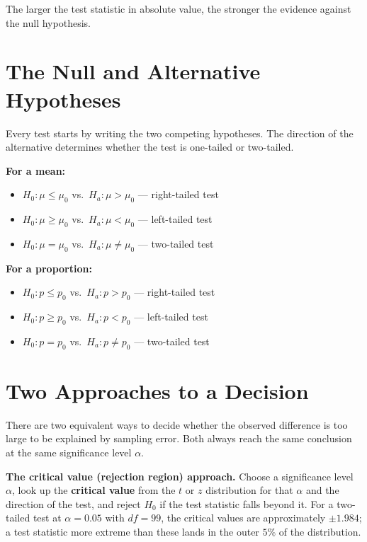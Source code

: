 \documentclass[
  11pt,
  letterpaper,
  DIV=11,
  numbers=noendperiod,
  oneside,
  open=any]{scrreprt}
\providecommand{\tightlist}{%
  \setlength{\itemsep}{0pt}\setlength{\parskip}{0pt}}\usepackage{longtable,booktabs,array}
\begin{document}
The larger the test statistic in absolute value, the stronger the
evidence against the null hypothesis.

\section{The Null and Alternative
Hypotheses}\label{the-null-and-alternative-hypotheses}

Every test starts by writing the two competing hypotheses. The direction
of the alternative determines whether the test is one-tailed or
two-tailed.

\textbf{For a mean:}

\begin{itemize}
\tightlist
\item
  \(H_0: \mu \leq \mu_0\) vs.~\(H_a: \mu > \mu_0\) --- right-tailed test
\item
  \(H_0: \mu \geq \mu_0\) vs.~\(H_a: \mu < \mu_0\) --- left-tailed test
\item
  \(H_0: \mu = \mu_0\) vs.~\(H_a: \mu \ne \mu_0\) --- two-tailed test
\end{itemize}

\textbf{For a proportion:}

\begin{itemize}
\tightlist
\item
  \(H_0: p \leq p_0\) vs.~\(H_a: p > p_0\) --- right-tailed test
\item
  \(H_0: p \geq p_0\) vs.~\(H_a: p < p_0\) --- left-tailed test
\item
  \(H_0: p = p_0\) vs.~\(H_a: p \ne p_0\) --- two-tailed test
\end{itemize}

\section{Two Approaches to a
Decision}\label{two-approaches-to-a-decision}

There are two equivalent ways to decide whether the observed difference
is too large to be explained by sampling error. Both always reach the
same conclusion at the same significance level \(\alpha\).

\textbf{The critical value (rejection region) approach.} Choose a
significance level \(\alpha\), look up the \textbf{critical value} from
the \(t\) or \(z\) distribution for that \(\alpha\) and the direction of
the test, and reject \(H_0\) if the test statistic falls beyond it. For
a two-tailed test at \(\alpha = 0.05\) with \(df = 99\), the critical
values are approximately \(\pm 1.984\); a test statistic more extreme
than these lands in the outer \(5\%\) of the distribution.
\end{document}
